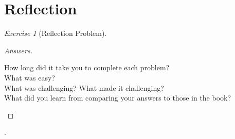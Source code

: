 \documentclass[12pt]{amsart}
\theoremstyle{remark}
\newtheorem*{exercise}{Exercise}%
\theoremstyle{mycomment}
\begin{document}
\section*{Reflection}
\begin{exercise}[Reflection Problem] \ 

\begin{proof}[Answers] \ \\
\begin{description}
\item[How long did it take you to complete each problem?]
\item[What was easy?]
\item[What was challenging? What made it challenging?]
\item[What did you learn from comparing your answers to those in the book?]
\end{description}
\end{proof}
\end{exercise}.









 
\end{document}
